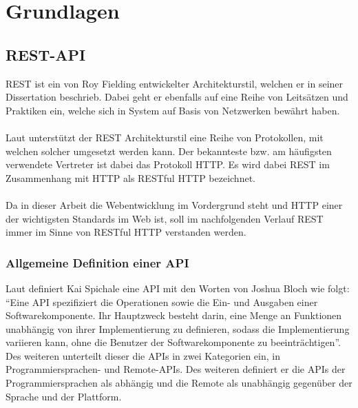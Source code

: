 
\chapter{Grundlagen}

\section{REST-API}
\gls{REST} ist ein von Roy Fielding entwickelter Architekturstil, welchen er in seiner Dissertation \cite{dissertationFielding} beschrieb. Dabei geht er ebenfalls auf eine Reihe von Leitsätzen und Praktiken ein, welche sich in System auf Basis von Netzwerken bewährt haben.\\
\\
Laut \cite[143]{apiDesign} unterstützt der REST Architekturstil eine Reihe von Protokollen, mit welchen solcher umgesetzt werden kann. Der bekannteste bzw. am häufigsten verwendete Vertreter ist dabei das Protokoll \gls{HTTP}. Es wird dabei \gls{REST} im Zusammenhang mit \gls{HTTP} als RESTful \gls{HTTP} bezeichnet. \\
\\
Da in dieser Arbeit die Webentwicklung im Vordergrund steht und \gls{HTTP} einer der wichtigsten Standards im Web ist, soll im nachfolgenden Verlauf \gls{REST} immer im Sinne von RESTful \gls{HTTP} verstanden werden.

\subsection{Allgemeine Definition einer \gls{API}}\label{sec:defAPI}
Laut \cite[7]{apiDesign} definiert Kai Spichale eine \gls{API} mit den Worten von Joshua Bloch wie folgt: \enquote{Eine API spezifiziert die Operationen sowie die Ein- und Ausgaben einer Softwarekomponente. Ihr Hauptzweck besteht darin, eine Menge an Funktionen unabhängig von ihrer Implementierung zu definieren, sodass die Implementierung variieren kann, ohne die Benutzer der Softwarekomponente zu beeinträchtigen}. Des weiteren unterteilt dieser die \glspl{API} in zwei Kategorien ein, in Programmiersprachen- und Remote-\glspl{API}. Des weiteren definiert er die \glspl{API} der Programmiersprachen als abhängig und die Remote als unabhängig gegenüber der Sprache und der Plattform. \cite[7-8]{apiDesign} 

